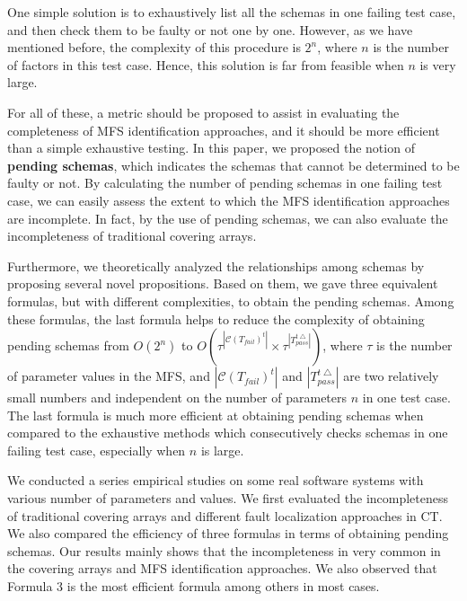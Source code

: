 One simple solution is to exhaustively list all the schemas in one failing test case, and then check them to be faulty or not one by one. However, as we have mentioned before, the complexity of this procedure is $2^{n}$, where $n$ is the number of factors in this test case. Hence, this solution is far from feasible when $n$ is very large.

For all of these, a metric should be proposed to assist in evaluating the completeness of MFS identification approaches, and it should be more efficient than a simple exhaustive testing. In this paper, we proposed the notion of \textbf{pending schemas}, which indicates the schemas that cannot be determined to be faulty or not. By calculating the number of pending schemas in one failing test case, we can easily assess the extent to which the MFS identification approaches are incomplete. In fact, by the use of pending schemas, we can also evaluate the incompleteness of traditional covering arrays.

Furthermore, we theoretically analyzed the relationships among schemas by proposing several novel propositions. Based on them, we gave three equivalent formulas, but with different complexities, to obtain the pending schemas. Among these formulas, the last formula helps to reduce the complexity of obtaining pending schemas from $O(2^{n})$ to $O(\tau^{|\mathcal{C}(T_{fail})^{t}|} \times \tau^{|T_{pass}^{t\bigtriangleup}|})$, where $\tau$ is the number of parameter values in the MFS, and $|\mathcal{C}(T_{fail})^{t}|$ and $|T_{pass}^{t\bigtriangleup}|$ are two relatively small numbers and independent on the number of parameters $n$ in one test case. The last formula is much more efficient at obtaining pending schemas when compared to the exhaustive methods which consecutively checks schemas in one failing test case, especially when $n$ is large.

We conducted a series empirical studies on some real software systems with various number of parameters and values. We first evaluated the incompleteness of traditional covering arrays and different fault localization approaches in CT. We also compared the efficiency of three formulas in terms of obtaining pending schemas. Our results mainly shows that the incompleteness in very common in the covering arrays and  MFS identification approaches. We also observed that Formula 3 is the most efficient formula among others in most cases.

